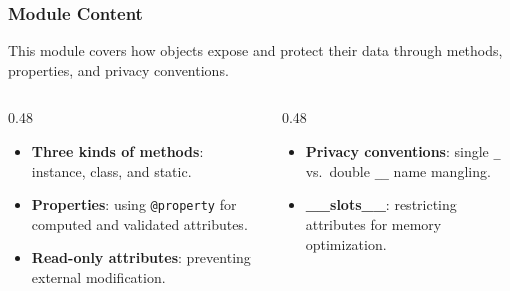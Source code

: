 \documentclass[aspectratio=169,10pt]{beamer}
\newcommand{\keyword}[1]{\textcolor{PrimaryBlue}{\textbf{#1}}}
\newcommand{\codeword}[1]{\texttt{#1}}
\begin{document}
\begin{frame}
\frametitle{Module Content}
\small
This module covers how objects expose and protect their data through methods, properties, and privacy conventions.

\vspace{0.16cm}
\begin{columns}[T,totalwidth=0.96\textwidth]
\begin{column}{0.48\textwidth}
\begin{itemize}\setlength\itemsep{0.08cm}
  \item \keyword{Three kinds of methods}: instance, class, and static.
  \item \keyword{Properties}: using \codeword{@property} for computed and validated attributes.
  \item \keyword{Read-only attributes}: preventing external modification.
\end{itemize}
\end{column}
\begin{column}{0.48\textwidth}
\begin{itemize}\setlength\itemsep{0.08cm}
  \item \keyword{Privacy conventions}: single \codeword{\_} vs.\ double \codeword{\_\_} name mangling.
  \item \keyword{\_\_slots\_\_}: restricting attributes for memory optimization.
\end{itemize}
\end{column}
\end{columns}
\end{frame}
\end{document}
